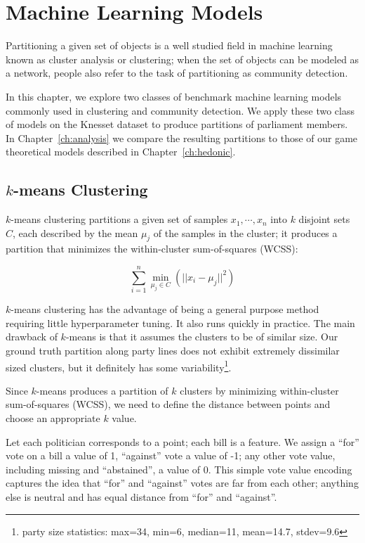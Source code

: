 
\chapter{Machine Learning Models}
\label{ch:comparison}
\vspace{2em}

Partitioning a given set of objects is a well studied field in machine learning
known as cluster analysis or clustering;
when the set of objects can be modeled as a network, people also refer to the
task of partitioning as community detection.

In this chapter, we explore two classes of benchmark machine learning models
commonly used in clustering and community detection.
We apply these two class of models on the Knesset dataset to produce partitions
of parliament members.
In Chapter~\ref{ch:analysis} we compare the resulting partitions to those of our
game theoretical models described in Chapter~\ref{ch:hedonic}.


\section{$k$-means Clustering}
\label{sec:k_means_clustering}

$k$-means clustering partitions a given set of samples $x_1, \cdots, x_n$ into
$k$ disjoint sets $C$, each described by the mean $\mu_j$ of the samples in the
cluster;
it produces a partition that minimizes the within-cluster sum-of-squares (WCSS):

\[
    \sum_{i=1}^{n} \underset{\mu_j \in C}{\min}(||x_i - \mu_j||^2)
\]

$k$-means clustering has the advantage of being a general purpose method
requiring little hyperparameter tuning. It also runs quickly in practice.
The main drawback of $k$-means is that it assumes the clusters to be of similar size.
Our ground truth partition along party lines does not exhibit extremely dissimilar sized
clusters, but it definitely has some variability\footnote{party size statistics:
max=34, min=6, median=11, mean=14.7, stdev=9.6}.

Since $k$-means produces a partition of $k$ clusters by minimizing within-cluster
sum-of-squares (WCSS), we need to define the distance between points and choose
an appropriate $k$ value.

Let each politician corresponds to a point; each bill is a feature.
We assign a ``for'' vote on a bill a value of 1, ``against'' vote a value of -1;
any other vote value, including missing and ``abstained'', a value of 0.
This simple vote value encoding captures the idea that ``for'' and ``against''
votes are far from each other; anything else is neutral and has equal distance
from ``for'' and ``against''.

